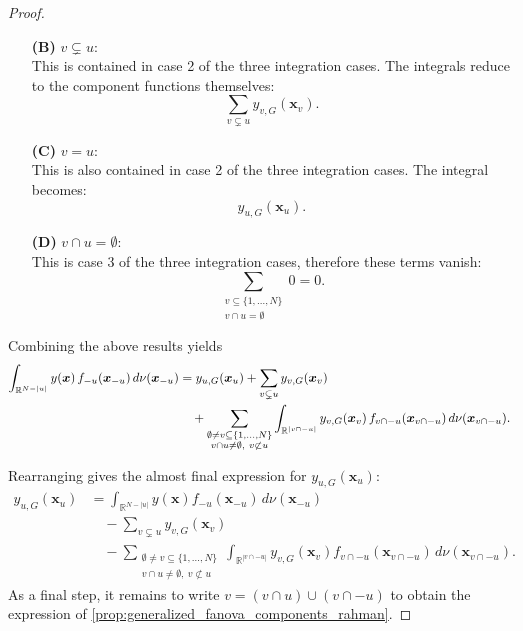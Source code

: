 \begin{proof}
\begin{itemize}
  \item[\textbf{(B)}] \( v \subsetneq u \): \\
  This is contained in case 2 of the three integration cases. The integrals reduce to the component functions themselves:
  \[
  \sum_{v \subsetneq u} y_{v,G}(\boldsymbol{x}_v).
  \]

  \item[\textbf{(C)}] \( v = u \): \\
  This is also contained in case 2 of the three integration cases. The integral becomes:
  \[
  y_{u,G}(\boldsymbol{x}_u).
  \]

  \item[\textbf{(D)}] \( v \cap u = \emptyset \): \\
  This is case 3 of the three integration cases, therefore these terms vanish:
  \[
  \sum_{\substack{v \subseteq \{1,\dots,N\} \\ v \cap u = \emptyset}} 0 = 0.
  \]
\end{itemize}
Combining the above results yields
\begin{align*}
\int_{\mathbb{R}^{N - |u|}} 
    y(\boldsymbol{x})\, f_{-u}(\boldsymbol{x}_{-u}) 
    \, d\nu(\boldsymbol{x}_{-u})
&= y_{u,G}(\boldsymbol{x}_u)
   + \sum_{v \subsetneq u} y_{v,G}(\boldsymbol{x}_v) \notag\\
&\quad
   + \sum_{\substack{\emptyset \ne v \subseteq \{1,\dots,N\}\\
                     v \cap u \ne \emptyset,\ v \not\subset u}} 
     \int_{\mathbb{R}^{|v \cap -u|}} 
        y_{v,G}(\boldsymbol{x}_v)\,
        f_{v \cap -u}(\boldsymbol{x}_{v \cap -u}) 
        \, d\nu(\boldsymbol{x}_{v \cap -u}).
\end{align*}

Rearranging gives the almost final expression for \( y_{u,G}(\boldsymbol{x}_u) \):
\[
\begin{aligned}
y_{u,G}(\boldsymbol{x}_u)
&= 
\int_{\mathbb{R}^{N - |u|}} 
    y(\boldsymbol{x}) 
    f_{-u}(\boldsymbol{x}_{-u}) 
    \, d \nu(\boldsymbol{x}_{-u})
\\[0.5em]
&\quad
- \sum_{v \subsetneq u} 
    y_{v,G}(\boldsymbol{x}_v)
\\[0.5em]
&\quad
- \sum_{\substack{\emptyset \ne v \subseteq \{1,\dots,N\}\\
                    v \cap u \ne \emptyset,\ v \not\subset u}}
    \int_{\mathbb{R}^{|v \cap -u|}} 
        y_{v,G}(\boldsymbol{x}_v) 
        f_{v \cap -u}(\boldsymbol{x}_{v \cap -u}) 
        \, d \nu(\boldsymbol{x}_{v \cap -u}).
\end{aligned}
\]
As a final step, it remains to write \( v = (v \cap u) \cup (v \cap -u) \) to obtain the expression of \autoref{prop:generalized_fanova_components_rahman}.
\end{proof}

